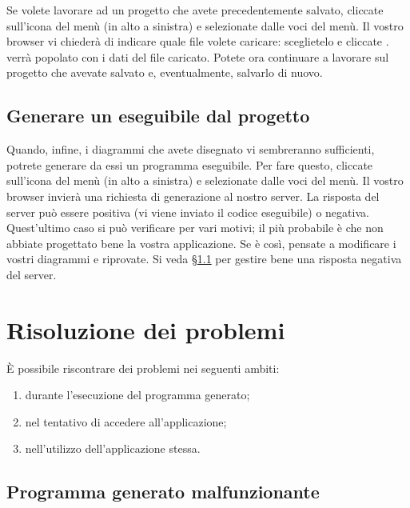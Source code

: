 Se volete lavorare ad un progetto che avete precedentemente salvato, cliccate sull'icona del menù (in alto a sinistra) e selezionate  dalle voci del menù. Il vostro browser vi chiederà di indicare quale file volete caricare: sceglietelo e cliccate . \proj{} verrà popolato con i dati del file caricato. Potete ora continuare a lavorare sul progetto che avevate salvato e, eventualmente, salvarlo di nuovo.



\subsection{Generare un eseguibile dal progetto} \label{sec:gen}

Quando, infine, i diagrammi che avete disegnato vi sembreranno sufficienti, potrete generare da essi un programma eseguibile. Per fare questo, cliccate sull'icona del menù (in alto a sinistra) e selezionate  dalle voci del menù. Il vostro browser invierà una richiesta di generazione al nostro server. La risposta del server può essere positiva (vi viene inviato il codice eseguibile) o negativa. Quest'ultimo caso si può verificare per vari motivi; il più probabile è che non abbiate progettato bene la vostra applicazione. Se è così, pensate a modificare i vostri diagrammi e riprovate. Si veda §\ref{sec:mal_gen} per gestire bene una risposta negativa del server.






\section{Risoluzione dei problemi} \label{sec:problemi}

È possibile riscontrare dei problemi nei seguenti ambiti:
\begin{enumerate}
	\item durante l'esecuzione del programma generato;
	\item nel tentativo di accedere all'applicazione;
	\item nell'utilizzo dell'applicazione stessa.
\end{enumerate}



\subsection{Programma generato malfunzionante} \label{sec:mal_gen}


